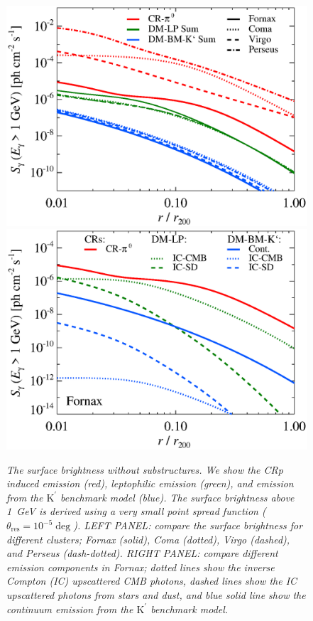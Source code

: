 \documentclass[10pt,aps,pra,reprint,amsmath,amsfonts,amssymb,showpacs]{revtex4-1}
\newcommand{\rmn}{\mathrm}
\newcommand{\psf}{\theta_\rmn{res}}
\newcommand{\Kp}{\rmn{K}^\prime}
\begin{document}
\begin{figure}
\begin{minipage}{2.0\columnwidth}
  \includegraphics[width=0.49\columnwidth]{figures/SB.v9.1GeV.SF300.noSuB.elmu.eps}
  \includegraphics[width=0.49\columnwidth]{figures/SB.fornax.v9.1GeV.SF300.noSuB.elmu.eps}
\caption{\it The surface brightness without substructures. We show the
  CRp induced emission (red), leptophilic emission (green), and
  emission from the $\Kp$ benchmark model (blue). The surface
  brightness above 1~GeV is derived using a very small point spread
  function ($\psf=10^{-5}\deg$). LEFT PANEL: compare the
  surface brightness for different clusters; Fornax (solid), Coma
  (dotted), Virgo (dashed), and Perseus (dash-dotted). RIGHT PANEL:
  compare different emission components in Fornax; dotted lines show
  the inverse Compton (IC) upscattered CMB photons, dashed lines show
  the IC upscattered photons from stars and dust, and blue solid line
  show the continuum emission from the $\Kp$ benchmark
  model.}
 \label{fig:SB_clu_nosub}
\end{minipage}
\end{figure}
\end{document}
